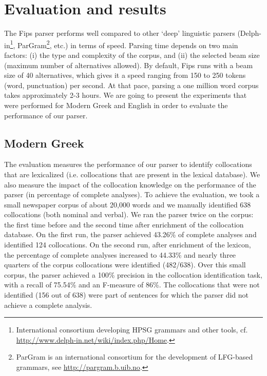 \documentclass[output=paper]{langsci/langscibook}
\begin{document}
\section{Evaluation and results}
The Fips parser performs well compared to other `deep' linguistic parsers (Delph-in\footnote{International consortium developing HPSG grammars and other tools, cf. \url{http://www.delph-in.net/wiki/index.php/Home}.}, ParGram\footnote{ParGram is an international consortium for the development of LFG-based grammars, see \url{http://pargram.b.uib.no}.}, etc.) in terms of speed. Parsing time depends on two main factors: (i) the type and complexity of the corpus, and (ii) the selected beam size (maximum number of alternatives allowed). By default, Fips runs with a beam size of 40 alternatives, which gives it a speed ranging from 150 to 250 tokens (word, punctuation) per second. At that pace, parsing a one million word corpus takes approximately 2-3 hours. We are going to present the experiments that were performed for Modern Greek and English in order to evaluate the performance of our parser. 

\subsection{Modern Greek}
The evaluation measures the performance of our parser to identify collocations that are lexicalized (i.e. collocations that are present in the lexical database). We also measure the impact of the collocation knowledge on the performance of the parser (in percentage of complete analyses). To achieve the evaluation, we took a small newspaper corpus of about 20,000 words  and we manually identified 638 collocations (both nominal and verbal). We ran the parser twice on the corpus: the first time before and the second time after enrichment of the collocation database. 
On the first run, the parser achieved 43.26\% of complete analyses and identified 124 collocations. On the second run, after enrichment of the lexicon, the percentage of complete analyses increased to 44.33\% and nearly three quarters of the corpus collocations were identified (482/638). Over this small corpus, the parser achieved a 100\% precision in the collocation identification task, with a recall of 75.54\% and an F-measure of 86\%. The collocations that were not identified (156 out of 638) were part of sentences for which the parser did not achieve a complete analysis.
	
\end{document}
